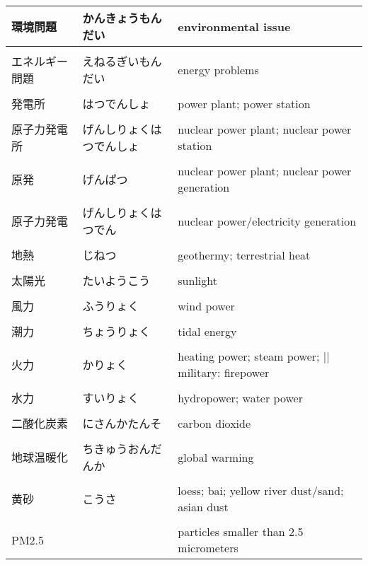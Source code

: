 \documentclass{article}
\begin{document}
\begin{tabular}{ l | l | p{10.5cm} }
環境問題     	&かんきょうもんだい   	&environmental issue \\ \hline \\[-1em]
エネルギー問題  &えねるぎいもんだい   	&energy problems \\ \hline \\[-1em]
発電所      	&はつでんしょ      	&power plant; power station \\ \hline \\[-1em]
原子力発電所  	&げんしりょくはつでんしょ	&nuclear power plant; nuclear power station \\ \hline \\[-1em]
原発        	&げんぱつ       	&nuclear power plant; nuclear power generation \\ \hline \\[-1em]
原子力発電   	&げんしりょくはつでん  	&nuclear power/electricity generation \\ \hline \\[-1em]
地熱        	&じねつ          	&geothermy; terrestrial heat \\ \hline \\[-1em]
太陽光       	&たいようこう       	&sunlight \\ \hline \\[-1em]
風力        	&ふうりょく         	&wind power \\ \hline \\[-1em]
潮力        	&ちょうりょく        	&tidal energy \\ \hline \\[-1em]
火力        	&かりょく          	&heating power; steam power; || military: firepower \\ \hline \\[-1em]
水力        	&すいりょく         	&hydropower; water power \\ \hline \\[-1em]
二酸化炭素   	&にさんかたんそ    	&carbon dioxide \\ \hline \\[-1em]
地球温暖化   	&ちきゅうおんだんか   	&global warming \\ \hline \\[-1em]
黄砂        	&こうさ          	&loess; bai; yellow river dust/sand; asian dust \\ \hline \\[-1em]
PM2.5      	&              	&particles smaller than 2.5 micrometers \\[-1em]
\end{tabular}
\end{document}
